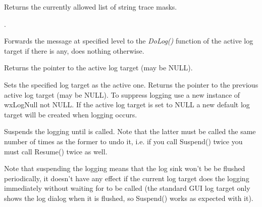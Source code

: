 
\label{wxloggettracemasks}


Returns the currently allowed list of string trace masks.


.

\label{wxlogonlog}


Forwards the message at specified level to the {\it DoLog()} function of the
active log target if there is any, does nothing otherwise.

\label{wxloggetactivetarget}


Returns the pointer to the active log target (may be NULL).

\label{wxlogsetactivetarget}


Sets the specified log target as the active one. Returns the pointer to the
previous active log target (may be NULL).  To suppress logging use a new
instance of wxLogNull not NULL.  If the active log target is set to NULL a
new default log target will be created when logging occurs.

\label{wxlogsuspend}


Suspends the logging until  is called. Note that
the latter must be called the same number of times as the former to undo it,
i.e. if you call Suspend() twice you must call Resume() twice as well.

Note that suspending the logging means that the log sink won't be be flushed
periodically, it doesn't have any effect if the current log target does the
logging immediately without waiting for  to be
called (the standard GUI log target only shows the log dialog when it is
flushed, so Suspend() works as expected with it).


